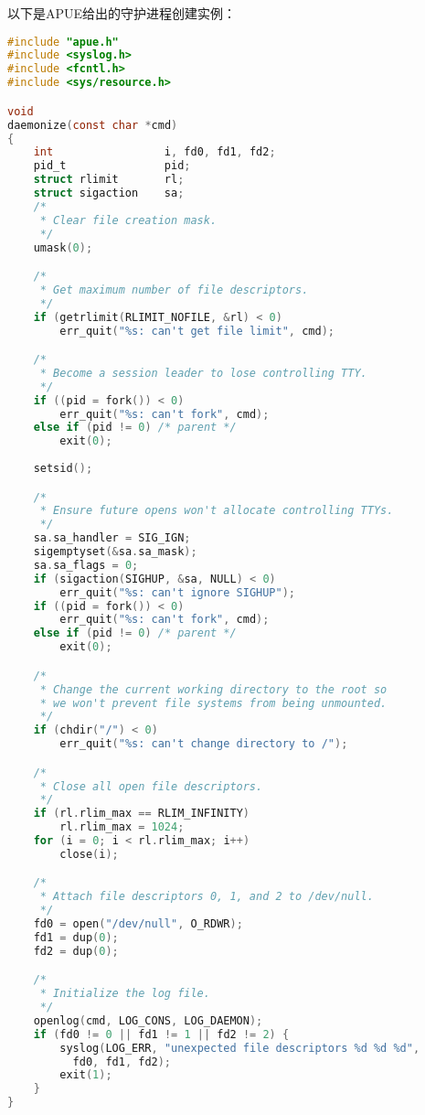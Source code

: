 以下是APUE给出的守护进程创建实例：
\begin{lstlisting}[language=C]
#include "apue.h"
#include <syslog.h>
#include <fcntl.h>
#include <sys/resource.h>

void
daemonize(const char *cmd)
{
    int                 i, fd0, fd1, fd2;
    pid_t               pid;
    struct rlimit       rl;
    struct sigaction    sa;
    /*
     * Clear file creation mask.
     */
    umask(0);

    /*
     * Get maximum number of file descriptors.
     */
    if (getrlimit(RLIMIT_NOFILE, &rl) < 0)
        err_quit("%s: can't get file limit", cmd);

    /*
     * Become a session leader to lose controlling TTY.
     */
    if ((pid = fork()) < 0)
        err_quit("%s: can't fork", cmd);
    else if (pid != 0) /* parent */
        exit(0);
        
    setsid();

    /*
     * Ensure future opens won't allocate controlling TTYs.
     */
    sa.sa_handler = SIG_IGN;
    sigemptyset(&sa.sa_mask);
    sa.sa_flags = 0;
    if (sigaction(SIGHUP, &sa, NULL) < 0)
        err_quit("%s: can't ignore SIGHUP");
    if ((pid = fork()) < 0)
        err_quit("%s: can't fork", cmd);
    else if (pid != 0) /* parent */
        exit(0);

    /*
     * Change the current working directory to the root so
     * we won't prevent file systems from being unmounted.
     */
    if (chdir("/") < 0)
        err_quit("%s: can't change directory to /");

    /*
     * Close all open file descriptors.
     */
    if (rl.rlim_max == RLIM_INFINITY)
        rl.rlim_max = 1024;
    for (i = 0; i < rl.rlim_max; i++)
        close(i);

    /*
     * Attach file descriptors 0, 1, and 2 to /dev/null.
     */
    fd0 = open("/dev/null", O_RDWR);
    fd1 = dup(0);
    fd2 = dup(0);

    /*
     * Initialize the log file.
     */
    openlog(cmd, LOG_CONS, LOG_DAEMON);
    if (fd0 != 0 || fd1 != 1 || fd2 != 2) {
        syslog(LOG_ERR, "unexpected file descriptors %d %d %d",
          fd0, fd1, fd2);
        exit(1);
    }
}


    
\end{lstlisting}
